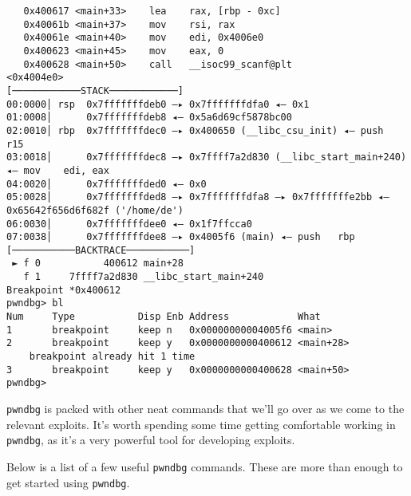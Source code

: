 \begin{lstlisting}
   0x400617 <main+33>    lea    rax, [rbp - 0xc]
   0x40061b <main+37>    mov    rsi, rax
   0x40061e <main+40>    mov    edi, 0x4006e0
   0x400623 <main+45>    mov    eax, 0
   0x400628 <main+50>    call   __isoc99_scanf@plt            <0x4004e0>
[────────────STACK────────────]
00:0000│ rsp  0x7fffffffdeb0 —▸ 0x7fffffffdfa0 ◂— 0x1
01:0008│      0x7fffffffdeb8 ◂— 0x5a6d69cf5878bc00
02:0010│ rbp  0x7fffffffdec0 —▸ 0x400650 (__libc_csu_init) ◂— push   r15
03:0018│      0x7fffffffdec8 —▸ 0x7ffff7a2d830 (__libc_start_main+240) ◂— mov    edi, eax
04:0020│      0x7fffffffded0 ◂— 0x0
05:0028│      0x7fffffffded8 —▸ 0x7fffffffdfa8 —▸ 0x7fffffffe2bb ◂— 0x65642f656d6f682f ('/home/de')
06:0030│      0x7fffffffdee0 ◂— 0x1f7ffcca0
07:0038│      0x7fffffffdee8 —▸ 0x4005f6 (main) ◂— push   rbp
[───────────BACKTRACE───────────]
 ► f 0           400612 main+28
   f 1     7ffff7a2d830 __libc_start_main+240
Breakpoint *0x400612
pwndbg> bl
Num     Type           Disp Enb Address            What
1       breakpoint     keep n   0x00000000004005f6 <main>
2       breakpoint     keep y   0x0000000000400612 <main+28>
	breakpoint already hit 1 time
3       breakpoint     keep y   0x0000000000400628 <main+50>
pwndbg> 
\end{lstlisting}

\texttt{pwndbg} is packed with other neat commands that we'll go over as we come
to the relevant exploits. It's worth spending some time getting comfortable
working in \texttt{pwndbg}, as it's a very powerful tool for developing
exploits.

Below is a list of a few useful \texttt{pwndbg} commands. These are more than
enough to get started using \texttt{pwndbg}.

